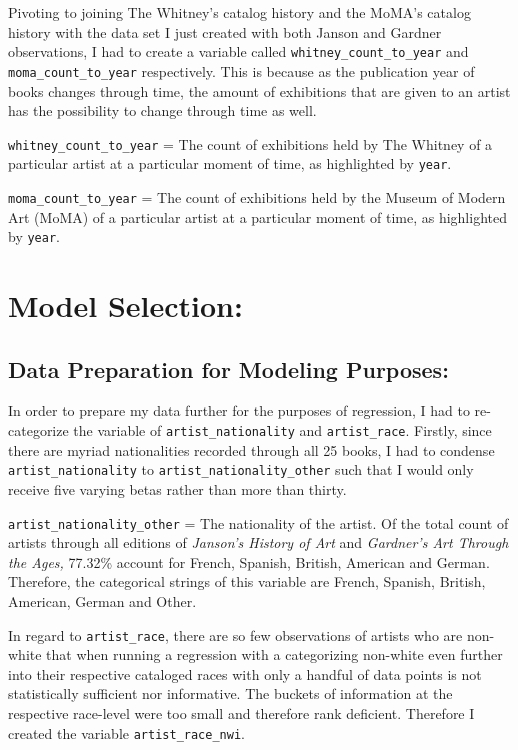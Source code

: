 \documentclass[
  letterpaper,
  DIV=11,
  numbers=noendperiod]{scrreprt}
\begin{document}
Pivoting to joining The Whitney's catalog history and the MoMA's catalog
history with the data set I just created with both Janson and Gardner
observations, I had to create a variable called
\texttt{whitney\_count\_to\_year} and \texttt{moma\_count\_to\_year}
respectively. This is because as the publication year of books changes
through time, the amount of exhibitions that are given to an artist has
the possibility to change through time as well.

\texttt{whitney\_count\_to\_year} = The count of exhibitions held by The
Whitney of a particular artist at a particular moment of time, as
highlighted by \texttt{year}.

\texttt{moma\_count\_to\_year} = The count of exhibitions held by the
Museum of Modern Art (MoMA) of a particular artist at a particular
moment of time, as highlighted by \texttt{year}.

\hypertarget{model-selection}{%
\section{Model Selection:}\label{model-selection}}

\hypertarget{data-preparation-for-modeling-purposes}{%
\subsection{Data Preparation for Modeling
Purposes:}\label{data-preparation-for-modeling-purposes}}

In order to prepare my data further for the purposes of regression, I
had to re-categorize the variable of \texttt{artist\_nationality} and
\texttt{artist\_race}. Firstly, since there are myriad nationalities
recorded through all 25 books, I had to condense
\texttt{artist\_nationality} to \texttt{artist\_nationality\_other} such
that I would only receive five varying betas rather than more than
thirty.

\texttt{artist\_nationality\_other} = The nationality of the artist. Of
the total count of artists through all editions of \emph{Janson's
History of Art} and \emph{Gardner's Art Through the Ages,} 77.32\%
account for French, Spanish, British, American and German. Therefore,
the categorical strings of this variable are French, Spanish, British,
American, German and Other.

In regard to \texttt{artist\_race}, there are so few observations of
artists who are non-white that when running a regression with a
categorizing non-white even further into their respective cataloged
races with only a handful of data points is not statistically sufficient
nor informative. The buckets of information at the respective race-level
were too small and therefore rank deficient. Therefore I created the
variable \texttt{artist\_race\_nwi}.
\end{document}
